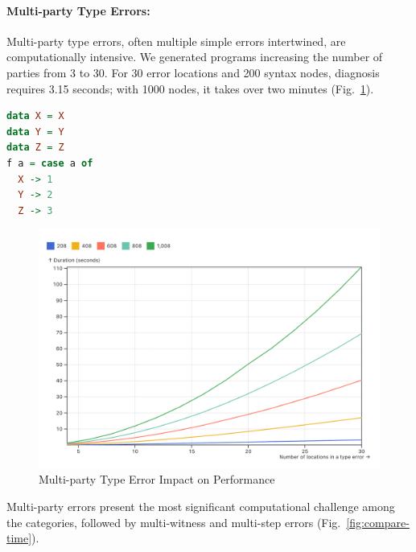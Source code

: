 \documentclass[pdflatex,sn-mathphys-num]{sn-jnl}%
\begin{document}
\paragraph{Multi-party Type Errors:} Multi-party type errors, often multiple simple errors intertwined, are computationally intensive. We generated programs increasing the number of parties from 3 to 30. For 30 error locations and 200 syntax nodes, diagnosis requires 3.15 seconds; with 1000 nodes, it takes over two minutes (Fig.~\ref{fig:multi-party-time}).

\begin{lstlisting}[language=Haskell, caption=Multi-party Haskell Example, label={lst:eval-multi-party}]
data X = X
data Y = Y
data Z = Z
f a = case a of 
  X -> 1
  Y -> 2
  Z -> 3
\end{lstlisting}

\begin{figure}[ht]
    \centering
    \includegraphics[width=0.8\linewidth]{images/multi-party-time.png}
    \caption{Multi-party Type Error Impact on Performance}
    \label{fig:multi-party-time}
\end{figure}

Multi-party errors present the most significant computational challenge among the categories, followed by multi-witness and multi-step errors (Fig.~\ref{fig:compare-time}).
\end{document}
